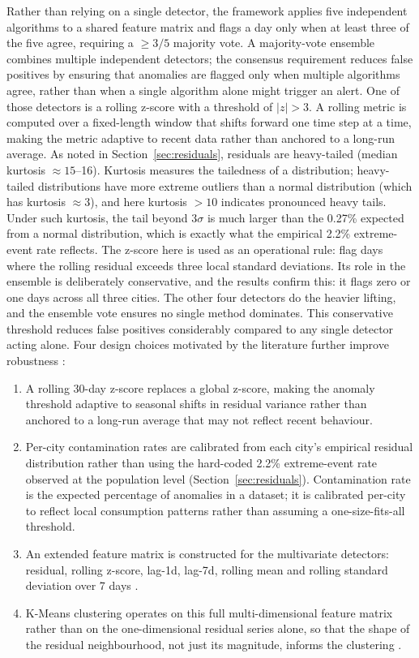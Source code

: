 ﻿\documentclass[12pt,reqno, twoside]{amsbook}
\numberwithin{figure}{chapter}
\numberwithin{table}{chapter}
\numberwithin{equation}{chapter}
\theoremstyle{plain}
\numberwithin{equation}{chapter}
\numberwithin{section}{chapter}
\begin{document}
Rather than relying on a single detector, the framework applies five independent algorithms to a shared feature matrix and flags a day only when at least three of the five agree, requiring a $\geq 3/5$ majority vote. A majority-vote ensemble combines multiple independent detectors; the consensus requirement reduces false positives by ensuring that anomalies are flagged only when multiple algorithms agree, rather than when a single algorithm alone might trigger an alert. One of those detectors is a rolling z-score with a threshold of $|z| > 3$. A rolling metric is computed over a fixed-length window that shifts forward one time step at a time, making the metric adaptive to recent data rather than anchored to a long-run average. As noted in Section~\ref{sec:residuals}, residuals are heavy-tailed (median kurtosis $\approx 15$--16). Kurtosis measures the tailedness of a distribution; heavy-tailed distributions have more extreme outliers than a normal distribution (which has kurtosis $\approx 3$), and here kurtosis $>10$ indicates pronounced heavy tails. Under such kurtosis, the tail beyond $3\sigma$ is much larger than the 0.27\% expected from a normal distribution, which is exactly what the empirical 2.2\% extreme-event rate reflects. The z-score here is used as an operational rule: flag days where the rolling residual exceeds three local standard deviations. Its role in the ensemble is deliberately conservative, and the results confirm this: it flags zero or one days across all three cities. The other four detectors do the heavier lifting, and the ensemble vote ensures no single method dominates. This conservative threshold reduces false positives considerably compared to any single detector acting alone. Four design choices motivated by the literature further improve robustness \cite{zangrando_anomaly_2022, m_z_h_unsupervised_2021, zhang_anomaly_2011}:

\begin{enumerate}
    \item A rolling 30-day z-score replaces a global z-score, making the anomaly threshold adaptive to seasonal shifts in residual variance rather than anchored to a long-run average that may not reflect recent behaviour.
    \item Per-city contamination rates are calibrated from each city's empirical residual distribution rather than using the hard-coded 2.2\% extreme-event rate observed at the population level (Section~\ref{sec:residuals}). Contamination rate is the expected percentage of anomalies in a dataset; it is calibrated per-city to reflect local consumption patterns rather than assuming a one-size-fits-all threshold.
    \item An extended feature matrix is constructed for the multivariate detectors: residual, rolling z-score, lag-1d, lag-7d, rolling mean and rolling standard deviation over 7 days \cite{m_z_h_unsupervised_2021}.
    \item K-Means clustering operates on this full multi-dimensional feature matrix rather than on the one-dimensional residual series alone, so that the shape of the residual neighbourhood, not just its magnitude, informs the clustering \cite{zhang_anomaly_2011}.
\end{enumerate}
\end{document}

